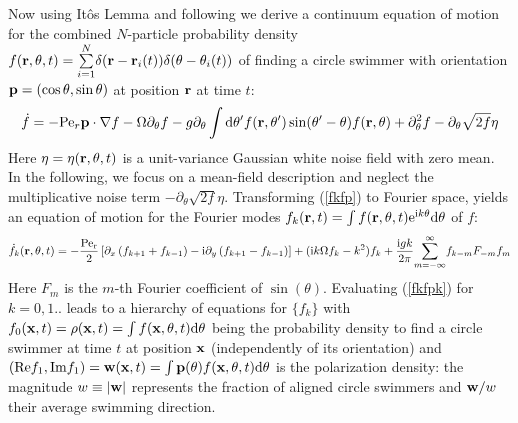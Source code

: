 \documentclass[aps,twocolumn,showlabels,showrefs,amsmath,amssymb,pre,superscriptaddress, floatfix, colors]{revtex4}
\newcommand{\1}{\begin{equation}}
\newcommand{\2}{\end{equation}}
\newcommand{\ea}{\begin{eqnarray}}
\newcommand{\ee}{\end{eqnarray}}
\newcommand{\4}[2]{{\frac{#1}{#2}}}
\newcommand{\I}{{ {\rm i}  }}
\newcommand{\de}{{\rm d}}
\newcommand{\Sum}[2]{{\sum\limits_{#1}^{#2}}}
\begin{document}
Now using It\^{o}s Lemma and following \cite{Dean1996sm}
we derive a continuum equation of motion for the combined $N$-particle probability density 
$f({\bf r},\theta,t)=\Sum{i=1}{N}\delta({\bf r}-{\bf r}_i(t))\delta(\theta-\theta_i(t))$ of finding a circle swimmer with 
orientation ${\bf p}=(\cos \theta, \sin \theta)$ at position ${\bf r}$ at time $t$:
\ea
\dot f = - {\rm Pe}_{r}{\bf p}\cdot \nabla f - \Omega \partial_\theta f - g \partial_\theta \int \de \theta' f({\bf r},\theta') \sin(\theta'-\theta) f({\bf r},\theta) + \partial^2_\theta f - \partial_\theta \sqrt{2 f} \eta
\label{fkfp}
\ee
Here $\eta= \eta({\bf r},\theta,t)$ is a unit-variance Gaussian white noise field with zero mean. 
In the following, we focus on a mean-field description and neglect the multiplicative noise term $-\partial_\theta \sqrt{2f}\eta$.
Transforming
(\ref{fkfp}) to Fourier space, yields an equation of motion for the Fourier modes $f_k({\bf r},t)=\int f({\bf r},\theta,t){\rm e}^{\I k \theta} \de \theta$
of $f$:
\1
\dot f_k({\bf r},\theta,t) =-\4{{\rm Pe}_{\rm r}}{2} \left[\partial_x \left(f_{k+1}+f_{k-1}\right) - \I \partial_y \left(f_{k+1}-f_{k-1}\right)\right]+(\I k \Omega f_k - k^2) f_k + 
\4{\I g k}{2\pi} \Sum{m=-\infty}{\infty}f_{k-m} F_{-m} f_m
\label{fkfpk}
\2
Here $F_m$ is the $m$-th Fourier coefficient of $\sin(\theta)$. 
Evaluating (\ref{fkfpk}) for $k=0,1..$ leads to a hierarchy of equations for $\{f_k\}$ with $f_0({\bf x},t)=\rho({\bf x},t)=\int f({\bf x},\theta,t)\de \theta$ 
being the probability density to find a circle swimmer at time $t$ at position ${\bf x}$
(independently of its orientation) 
and $({\rm Re}f_1,{\rm Im}f_1)={\bf w}({\bf x},t)=\int {\bf p}(\theta) f({\bf x},\theta,t) \de \theta$ is the polarization density: the magnitude $w\equiv |{\bf w}|$ 
represents the fraction of aligned circle swimmers and ${\bf w}/w$ their average swimming direction. 
\end{document}
